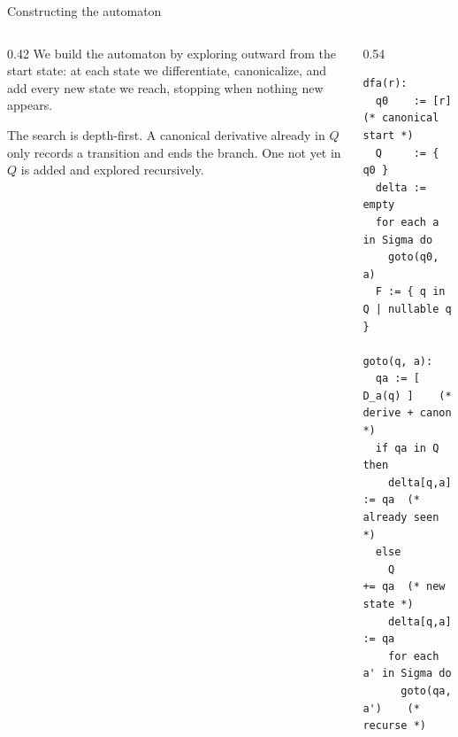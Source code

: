 \documentclass[aspectratio=169]{beamer}
\begin{document}
\begin{frame}[fragile]{Constructing the automaton}
  \begin{columns}[T,onlytextwidth]
    \begin{column}{0.42\textwidth}
      We build the automaton by exploring outward from the start state: at each
      state we differentiate, canonicalize, and add every new state we reach,
      stopping when nothing new appears.

      \bigskip\bigskip
      The search is depth-first. A canonical derivative already in $Q$ only
      records a transition and ends the branch. One not yet in $Q$ is added and
      explored recursively.
    \end{column}
    \hfill
    \begin{column}{0.54\textwidth}
\begin{lstlisting}[style=rocqstyle,basicstyle=\ttfamily\scriptsize]
dfa(r):
  q0    := [r]        (* canonical start *)
  Q     := { q0 }
  delta := empty
  for each a in Sigma do
    goto(q0, a)
  F := { q in Q | nullable q }

goto(q, a):
  qa := [ D_a(q) ]    (* derive + canon *)
  if qa in Q then
    delta[q,a] := qa  (* already seen *)
  else
    Q          += qa  (* new state *)
    delta[q,a] := qa
    for each a' in Sigma do
      goto(qa, a')    (* recurse *)
\end{lstlisting}
    \end{column}
  \end{columns}
\end{frame}
\end{document}
